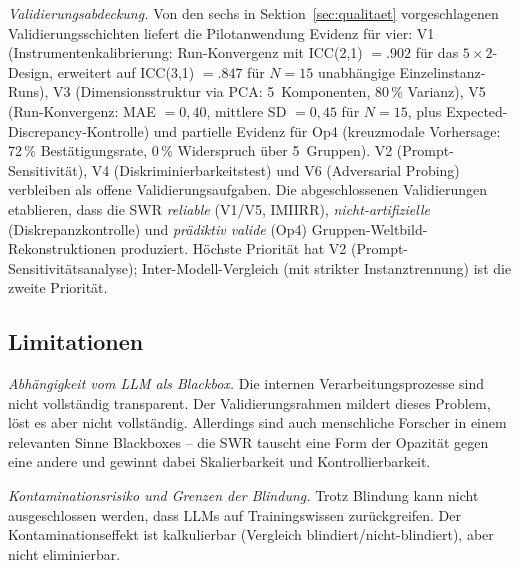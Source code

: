 \documentclass[11pt,a4paper]{article}
\theoremstyle{definition}
\theoremstyle{plain}
\theoremstyle{remark}
\begin{document}
\emph{Validierungsabdeckung.} Von den sechs in Sektion~\ref{sec:qualitaet} vorgeschlagenen Validierungsschichten liefert die Pilotanwendung Evidenz f\"ur vier: V1 (Instrumentenkalibrierung: Run-Konvergenz mit ICC(2,1) $= .902$ f\"ur das $5 \times 2$-Design, erweitert auf ICC(3,1) $= .847$ f\"ur $N = 15$ unabh\"angige Einzelinstanz-Runs), V3 (Dimensionsstruktur via PCA: 5~Komponenten, 80\,\% Varianz), V5 (Run-Konvergenz: MAE $= 0{,}40$, mittlere SD $= 0{,}45$ f\"ur $N = 15$, plus Expected-Discrepancy-Kontrolle) und partielle Evidenz f\"ur Op4 (kreuzmodale Vorhersage: 72\,\% Best\"atigungsrate, 0\,\% Widerspruch \"uber 5~Gruppen). V2 (Prompt-Sensitivit\"at), V4 (Diskriminierbarkeitstest) und V6 (Adversarial Probing) verbleiben als offene Validierungsaufgaben. Die abgeschlossenen Validierungen etablieren, dass die SWR \emph{reliable} (V1/V5, IMIIRR), \emph{nicht-artifizielle} (Diskrepanzkontrolle) und \emph{pr\"adiktiv valide} (Op4) Gruppen-Weltbild-Rekonstruktionen produziert. H\"ochste Priorit\"at hat V2 (Prompt-Sensitivit\"atsanalyse); Inter-Modell-Vergleich (mit strikter Instanztrennung) ist die zweite Priorit\"at.

\subsection{Limitationen}
\label{sec:limitationen}

\emph{Abh\"angigkeit vom LLM als Blackbox.} Die internen Verarbeitungsprozesse sind nicht vollst\"andig transparent. Der Validierungsrahmen mildert dieses Problem, l\"ost es aber nicht vollst\"andig. Allerdings sind auch menschliche Forscher in einem relevanten Sinne Blackboxes -- die SWR tauscht eine Form der Opazit\"at gegen eine andere und gewinnt dabei Skalierbarkeit und Kontrollierbarkeit.

\emph{Kontaminationsrisiko und Grenzen der Blindung.} Trotz Blindung kann nicht ausgeschlossen werden, dass LLMs auf Trainingswissen zur\"uckgreifen. Der Kontaminationseffekt ist kalkulierbar (Vergleich blindiert/nicht-blindiert), aber nicht eliminierbar.
\end{document}
